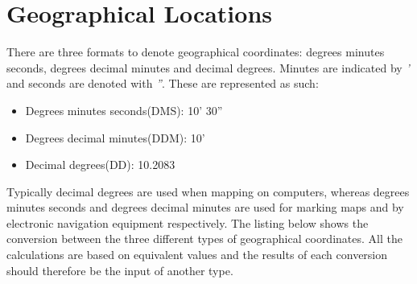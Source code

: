 \section{Geographical Locations} \label{sec:geo_coordinates}
There are three formats to denote geographical coordinates: degrees minutes seconds, degrees decimal minutes and decimal degrees\cite{geo_types}. Minutes are indicated by \emph{'} and seconds are denoted with \emph{''}. These are represented as such:
\begin{itemize}
	\item Degrees minutes seconds(DMS): 10' 30''
	\item Degrees decimal minutes(DDM): 10'
	\item Decimal degrees(DD): 10.2083\degree
\end{itemize}

Typically decimal degrees are used when mapping on computers, whereas degrees minutes seconds and degrees decimal minutes are used for marking maps and by electronic navigation equipment respectively\cite{geo_types}. The listing below shows the conversion between the three different types of geographical coordinates. All the calculations are based on equivalent values and the results of each conversion should therefore be the input of another type\cite{geo_converter}.


